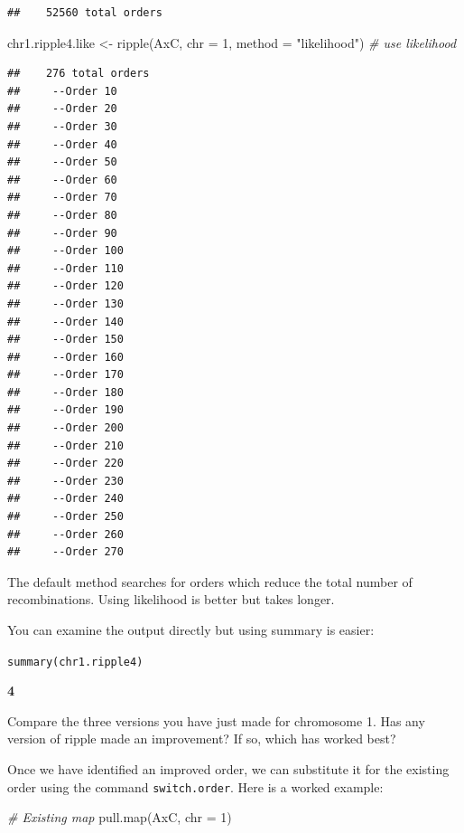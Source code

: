 \documentclass[
]{book}
\makeatletter
\newenvironment{Shaded}{\begin{snugshade}}{\end{snugshade}}
\newcommand{\AttributeTok}[1]{\textcolor[rgb]{0.77,0.63,0.00}{#1}}
\newcommand{\CommentTok}[1]{\textcolor[rgb]{0.56,0.35,0.01}{\textit{#1}}}
\newcommand{\DecValTok}[1]{\textcolor[rgb]{0.00,0.00,0.81}{#1}}
\newcommand{\FunctionTok}[1]{\textcolor[rgb]{0.00,0.00,0.00}{#1}}
\newcommand{\NormalTok}[1]{#1}
\newcommand{\OtherTok}[1]{\textcolor[rgb]{0.56,0.35,0.01}{#1}}
\newcommand{\StringTok}[1]{\textcolor[rgb]{0.31,0.60,0.02}{#1}}
\newenvironment{kframe}{%
\medskip{}
\setlength{\fboxsep}{.8em}
 \def\at@end@of@kframe{}%
 \ifinner\ifhmode%
  \def\at@end@of@kframe{\end{minipage}}%
  \begin{minipage}{\columnwidth}%
 \fi\fi%
 \def\FrameCommand##1{\hskip\@totalleftmargin \hskip-\fboxsep
 \colorbox{shadecolor}{##1}\hskip-\fboxsep
     \hskip-\linewidth \hskip-\@totalleftmargin \hskip\columnwidth}%
 \MakeFramed {\advance\hsize-\width
   \@totalleftmargin\z@ \linewidth\hsize
   \@setminipage}}%
 {\par\unskip\endMakeFramed%
 \at@end@of@kframe}
\newenvironment{rmdblock}[1]
  {
  \begin{itemize}
  \renewcommand{\labelitemi}{
    \raisebox{-.7\height}[0pt][0pt]{
      {\setkeys{Gin}{width=3em,keepaspectratio}\texttt{[image: images/\#1]}}
    }
  }
  \setlength{\fboxsep}{1em}
  \begin{kframe}
  \item
  }
  {
  \end{kframe}
  \end{itemize}
  }
\newenvironment{rmdquiz}
  {\begin{rmdblock}{quiz}}
  {\end{rmdblock}}
\makeatother
\begin{document}
\begin{verbatim}
##    52560 total orders
\end{verbatim}

\begin{Shaded}
\begin{Highlighting}[]
\NormalTok{chr1.ripple4.like }\OtherTok{\textless{}{-}} \FunctionTok{ripple}\NormalTok{(AxC, }\AttributeTok{chr =} \DecValTok{1}\NormalTok{, }\AttributeTok{method =} \StringTok{"likelihood"}\NormalTok{)  }\CommentTok{\# use likelihood}
\end{Highlighting}
\end{Shaded}

\begin{verbatim}
##    276 total orders
##     --Order 10 
##     --Order 20 
##     --Order 30 
##     --Order 40 
##     --Order 50 
##     --Order 60 
##     --Order 70 
##     --Order 80 
##     --Order 90 
##     --Order 100 
##     --Order 110 
##     --Order 120 
##     --Order 130 
##     --Order 140 
##     --Order 150 
##     --Order 160 
##     --Order 170 
##     --Order 180 
##     --Order 190 
##     --Order 200 
##     --Order 210 
##     --Order 220 
##     --Order 230 
##     --Order 240 
##     --Order 250 
##     --Order 260 
##     --Order 270
\end{verbatim}

The default method searches for orders which reduce the total number of recombinations. Using likelihood is better but takes longer.

You can examine the output directly but using summary is easier:

\texttt{summary(chr1.ripple4)}

\begin{rmdquiz}
\textbf{4}

Compare the three versions you have just made for chromosome 1. Has any version of ripple made an improvement? If so, which has worked best?
\end{rmdquiz}

Once we have identified an improved order, we can substitute it for the existing order using the command \texttt{switch.order}. Here is a worked example:

\begin{Shaded}
\begin{Highlighting}[]
\CommentTok{\# Existing map}
\FunctionTok{pull.map}\NormalTok{(AxC, }\AttributeTok{chr =} \DecValTok{1}\NormalTok{)}
\end{Highlighting}
\end{Shaded}
\end{document}
